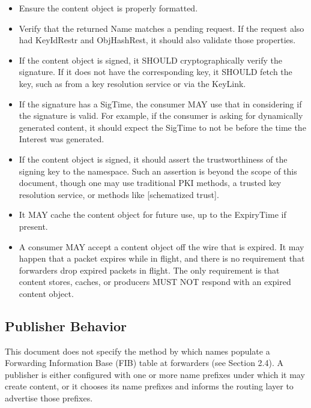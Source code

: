 \documentclass[12pt]{article}
\begin{document}
\begin{itemize}
\item Ensure the content object is properly formatted.

\item Verify that the returned Name matches a pending request.  If the
      request also had KeyIdRestr and ObjHashRest, it should also
      validate those properties.

\item If the content object is signed, it SHOULD cryptographically
      verify the signature.  If it does not have the corresponding key,
      it SHOULD fetch the key, such as from a key resolution service or
      via the KeyLink.

\item If the signature has a SigTime, the consumer MAY use that in
      considering if the signature is valid.  For example, if the
      consumer is asking for dynamically generated content, it should
      expect the SigTime to not be before the time the Interest was
      generated.

\item If the content object is signed, it should assert the
      trustworthiness of the signing key to the namespace.  Such an
      assertion is beyond the scope of this document, though one may use
      traditional PKI methods, a trusted key resolution service, or
      methods like [schematized trust].

\item It MAY cache the content object for future use, up to the
      ExpiryTime if present.

\item A consumer MAY accept a content object off the wire that is
      expired.  It may happen that a packet expires while in flight, and
      there is no requirement that forwarders drop expired packets in
      flight.  The only requirement is that content stores, caches, or
      producers MUST NOT respond with an expired content object.
\end{itemize}

\subsection{Publisher Behavior}
This document does not specify the method by which names populate a
Forwarding Information Base (FIB) table at forwarders (see
Section 2.4).  A publisher is either configured with one or more name
prefixes under which it may create content, or it chooses its name
prefixes and informs the routing layer to advertise those prefixes.
\end{document}
